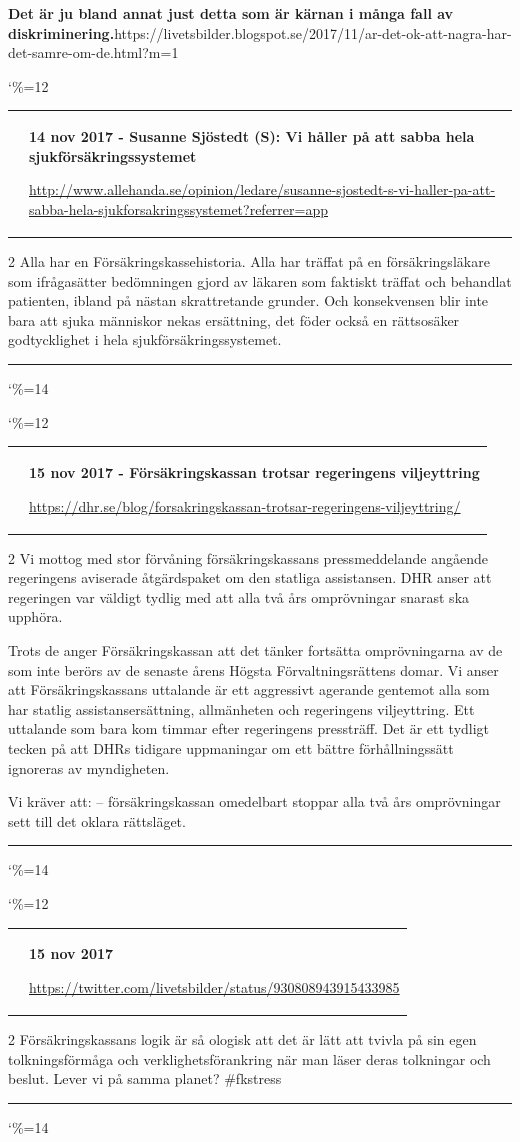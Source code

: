 \documentclass[a4paper]{article}
\makeatletter
\newcommand{\entry}{
\catcode`\%=12
\@entry}
\newcommand{\@entry}[3]{
\bigskip
\begin{tabular*}{\textwidth}{l m{\textwidth-4cm}}
\qrcode{#3} & \textbf{#1}

\medskip

\url{#3}

\end{tabular*}

\medskip


\begin{multicols}{2}
#2
\end{multicols}

\medskip
\hrule

\catcode`\%=14
}
\makeatother
\begin{document}
{{{{\textbf{Det är ju bland annat just detta som är kärnan i många fall av diskriminering.}}{https://livetsbilder.blogspot.se/2017/11/ar-det-ok-att-nagra-har-det-samre-om-de.html?m=1}

\entry{14 nov 2017 - Susanne Sjöstedt (S): Vi håller på att sabba hela sjukförsäkringssystemet}{Alla har en Försäkringskassehistoria. Alla har träffat på en försäkringsläkare som ifrågasätter bedömningen gjord av läkaren som faktiskt träffat och behandlat patienten, ibland på nästan skrattretande grunder. Och konsekvensen blir inte bara att sjuka människor nekas ersättning, det föder också en rättsosäker godtycklighet i hela sjukförsäkringssystemet.}{http://www.allehanda.se/opinion/ledare/susanne-sjostedt-s-vi-haller-pa-att-sabba-hela-sjukforsakringssystemet?referrer=app}

\entry{15 nov 2017 - Försäkringskassan trotsar regeringens viljeyttring}{Vi mottog med stor förvåning försäkringskassans pressmeddelande angående regeringens aviserade åtgärdspaket om den statliga assistansen. DHR anser att regeringen var väldigt tydlig med att alla två års omprövningar snarast ska upphöra.

Trots de anger Försäkringskassan att det tänker fortsätta omprövningarna av de som inte berörs av de senaste årens Högsta Förvaltningsrättens domar. Vi anser att Försäkringskassans uttalande är ett aggressivt agerande gentemot alla som har statlig assistansersättning, allmänheten och regeringens viljeyttring. Ett uttalande som bara kom timmar efter regeringens pressträff. Det är ett tydligt tecken på att DHRs tidigare uppmaningar om ett bättre förhållningssätt ignoreras av myndigheten.

Vi kräver att:
– försäkringskassan omedelbart stoppar alla två års omprövningar sett till det oklara rättsläget.}{https://dhr.se/blog/forsakringskassan-trotsar-regeringens-viljeyttring/}

\entry{15 nov 2017}{Försäkringskassans logik är så ologisk att det är lätt att tvivla på sin egen tolkningsförmåga och verklighetsförankring när man läser deras tolkningar och beslut. Lever vi på samma planet? \#fkstress}{https://twitter.com/livetsbilder/status/930808943915433985}

}}}
\end{document}
